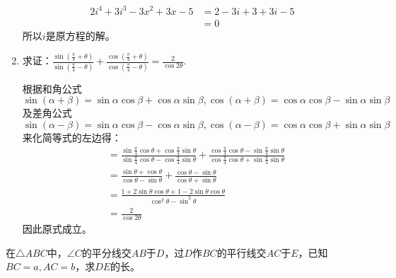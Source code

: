 \documentclass[answers]{exam}
\begin{document}
\begin{questions}
\begin{enumerate}[label=(\arabic*)]
\begin{solution}
\begin{align*}
				      2i^4 + 3i^3 - 3x^2 + 3x - 5 & = 2 - 3i + 3  + 3i - 5 \\
				                                  & = 0
			      \end{align*}
			      所以$i$是原方程的解。
		      \end{solution}
		\item 求证：$\displaystyle
			      \frac{\sin\left(\frac{\pi}{4} + \theta \right)}{\sin \left( \frac{\pi}{4} - \theta \right)} +
			      \frac{\cos\left(\frac{\pi}{4} + \theta \right)}{\cos \left( \frac{\pi}{4} - \theta \right)} =
			      \frac{2}{\cos2\theta}
		      $.
		      \begin{solution}
			      根据和角公式 $\sin(\alpha+\beta) = \sin\alpha\cos\beta + \cos\alpha\sin\beta,
				      \cos(\alpha+\beta)=\cos\alpha\cos\beta - \sin\alpha\sin\beta$及差角公式$\sin(\alpha-\beta) =
				      \sin\alpha\cos\beta - \cos\alpha\sin\beta, \cos(\alpha-\beta)=\cos\alpha\cos\beta +
				      \sin\alpha\sin\beta$来化简等式的左边得：
			      \begin{align*}
				       & = 	\frac{\sin\frac{\pi}{4}\cos\theta +
					      \cos\frac{\pi}{4}\sin\theta}{\sin\frac{\pi}{4}\cos\theta-\cos\frac{\pi}{4}\sin\theta} +
				      \frac{\cos\frac{\pi}{4}\cos\theta - \sin\frac{\pi}{4}\sin\theta}{\cos\frac{\pi}{4}\cos\theta +
				      \sin\frac{\pi}{4}\sin\theta}                                                              \\
				       & =
				      \frac{\sin\theta + \cos\theta}{\cos\theta - \sin\theta} + \frac{\cos\theta -
				      \sin\theta}{\cos\theta + \sin\theta}                                                      \\
				       & =
				      \frac{1 + 2\sin\theta\cos\theta + 1 - 2\sin\theta\cos\theta}{\cos^2\theta - \sin^2\theta} \\
				       & = \frac{2}{\cos2\theta}
			      \end{align*}
			      因此原式成立。
		      \end{solution}
	\end{enumerate}
	\question 在$\triangle{ABC}$中，$\angle{C}$的平分线交$AB$于$D$，过$D$作$BC$的平行线交$AC$于$E$，已知$BC=a, AC=b$，求$DE$的长。

	\begin{figure}[htbp]
		\centering
\end{figure}
\end{questions}
\end{document}
